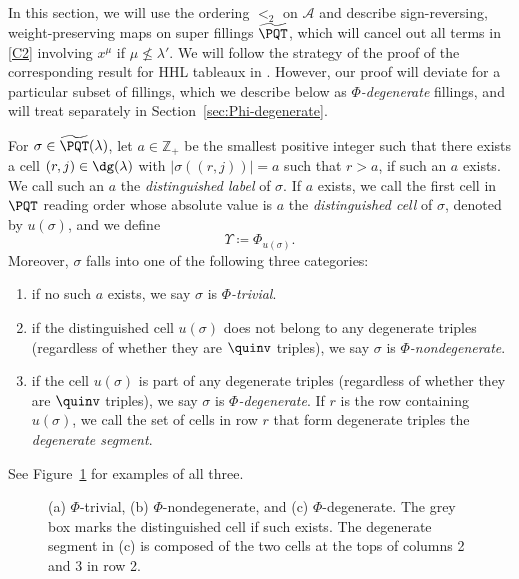 In this section, we will use the ordering $<_2$ on $\mathcal{A}$ and describe sign-reversing, weight-preserving maps on super fillings $\widetilde{\PQT}$, which will cancel out all terms in \eqref{C2} involving $x^{\mu}$ if $\mu \not\leq \lambda'$. We will follow the strategy of the proof of the corresponding result for HHL tableaux in \cite[Section 5.2]{HHL05}. 
However, our proof will deviate for a particular subset of fillings, which we describe below as \emph{$\Phi$-degenerate} fillings, and will treat separately in Section~\ref{sec:Phi-degenerate}.

\begin{defn}
For $\sigma\in\widetilde{\PQT}(\lambda)$, let $a\in\mathbb{Z}_+$ be the smallest positive integer such that there exists a cell $(r,j)\in\dg(\lambda)$ with $|\sigma((r,j))|=a$ such that $r>a$, if such an $a$ exists. We call such an $a$ the \emph{distinguished label} of $\sigma$. 
If $a$ exists, we call the first cell in $\PQT$ reading order whose absolute value is $a$ the \emph{distinguished cell} of $\sigma$, denoted by $u(\sigma)$, and we define 
\[\Upsilon\coloneqq\Phi_{u(\sigma)}.
\]
Moreover, $\sigma$ falls into one of the following three categories:
\begin{enumerate}[label=(\alph*),leftmargin=20pt]
\item if no such $a$ exists, we say $\sigma$ is \emph{$\Phi$-trivial}.
\item if the distinguished cell $u(\sigma)$ does not belong to any degenerate triples \textup{(}regardless of whether they are $\quinv$ triples\textup{)}, we say $\sigma$ is \emph{$\Phi$-nondegenerate}.
\item if the cell $u(\sigma)$ is part of any degenerate triples \textup{(}regardless of whether they are $\quinv$ triples\textup{)}, we say $\sigma$ is \emph{$\Phi$-degenerate}. If $r$ is the row containing $u(\sigma)$, we call the set of cells in row $r$ that form degenerate triples the \emph{degenerate segment}.
\end{enumerate}
See Figure~\ref{fig:degenerate} for examples of all three.
\end{defn}

\begin{figure}[h]
\centering
{}
\quad
{}
\quad
{}
\caption{(a) $\Phi$-trivial, (b) $\Phi$-nondegenerate, and (c) $\Phi$-degenerate. The grey box marks the distinguished cell if such exists. The degenerate segment in (c) is composed of the two cells at the tops of columns 2 and 3 in row 2.}\label{fig:degenerate}
\end{figure}

